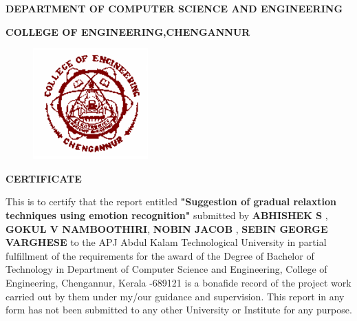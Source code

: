 \documentclass[12pt,a4paper,final]{extreport}
\begin{document}
\begin{center}\fontsize{14}{17} \selectfont \textbf{DEPARTMENT OF COMPUTER SCIENCE AND ENGINEERING}\end{center}
\begin{center}\fontsize{14}{17} \selectfont \textbf{COLLEGE OF ENGINEERING,CHENGANNUR}\end{center}
\begin{figure}[h]
	\begin{center}
		\includegraphics[scale=.8]{ceclogo.png}
		\vspace{.1 cm}
	\end{center}
\end{figure}

\begin{center}\fontsize{14}{17} \selectfont \textbf{CERTIFICATE}\end{center}
This is to certify that the report entitled \textbf{{\large "Suggestion of gradual relaxtion techniques using emotion recognition"}} submitted by \textbf{ABHISHEK S },\textbf{ GOKUL V NAMBOOTHIRI}, \textbf{NOBIN JACOB },\textbf{ SEBIN GEORGE VARGHESE } to the APJ Abdul Kalam Technological University in partial fulfillment of the requirements for the award of the Degree of Bachelor of Technology in Department of Computer Science and Engineering, College of Engineering, Chengannur, Kerala -689121 is a bonafide record of the project work carried out by them under my/our guidance and supervision. This report in any form has not been submitted to any other University or Institute for any purpose.
\end{document}
